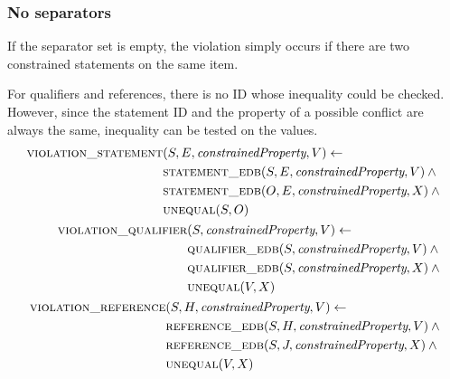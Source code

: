 \documentclass[hyperref,bachelorofscience,fleqn]{cgvpub}
\begin{document}
\subsubsection{No separators}\label{subsubsec_single_value_no_separators}
If the separator set is empty, the violation simply occurs if there are two constrained statements on the same item.

For qualifiers and references, there is no ID whose inequality could be checked. However, since the statement ID and the property of a possible conflict are always the same, inequality can be tested on the values.
\begin{align}
\begin{split}\label{eq_no_separators_triple}
\textsc{violation\_statement}&(S, E, \emph{constrainedProperty}, V) \leftarrow \\
&\textsc{statement\_edb}(S, E, \emph{constrainedProperty}, V) \wedge{} \\
&\textsc{statement\_edb}(O, E, \emph{constrainedProperty}, X) \wedge{} \\
&\textsc{unequal}(S, O)
\end{split}\\
\begin{split}
\textsc{violation\_qualifier}&(S, \emph{constrainedProperty}, V) \leftarrow \\
&\textsc{qualifier\_edb}(S, \emph{constrainedProperty}, V) \wedge{} \\
&\textsc{qualifier\_edb}(S, \emph{constrainedProperty}, X) \wedge{} \\
&\textsc{unequal}(V, X)
\end{split}\\
\begin{split}
\textsc{violation\_reference}&(S, H, \emph{constrainedProperty}, V) \leftarrow \\
&\textsc{reference\_edb}(S, H, \emph{constrainedProperty}, V) \wedge{} \\
&\textsc{reference\_edb}(S, J, \emph{constrainedProperty}, X) \wedge{} \\
&\textsc{unequal}(V, X)
\end{split}
\end{align}
\end{document}
